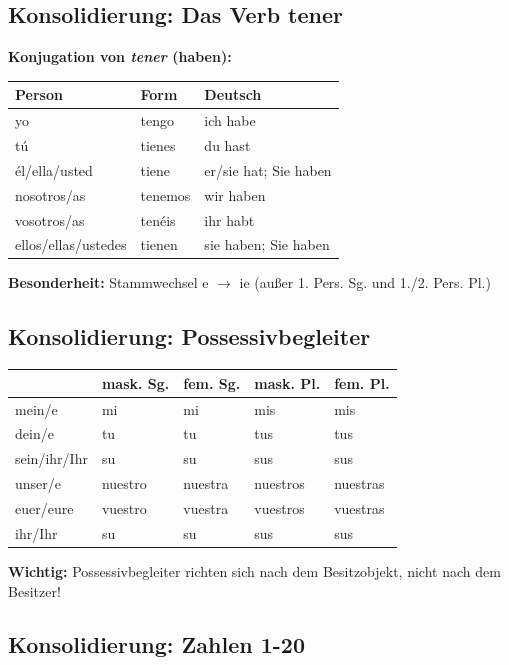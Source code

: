 \documentclass[11pt,a4paper]{article}
\begin{document}
\subsection{Konsolidierung: Das Verb tener}

\textbf{Konjugation von \textit{tener} (haben):}
\begin{center}
\begin{tabular}{|l|l|l|}
\hline
\textbf{Person} & \textbf{Form} & \textbf{Deutsch} \\
\hline
yo & tengo & ich habe \\
tú & tienes & du hast \\
él/ella/usted & tiene & er/sie hat; Sie haben \\
nosotros/as & tenemos & wir haben \\
vosotros/as & tenéis & ihr habt \\
ellos/ellas/ustedes & tienen & sie haben; Sie haben \\
\hline
\end{tabular}
\end{center}

\textbf{Besonderheit:} Stammwechsel e $\rightarrow$ ie (außer 1. Pers. Sg. und 1./2. Pers. Pl.)

\subsection{Konsolidierung: Possessivbegleiter}

\begin{center}
\begin{tabular}{|l|l|l|l|l|}
\hline
& \textbf{mask. Sg.} & \textbf{fem. Sg.} & \textbf{mask. Pl.} & \textbf{fem. Pl.} \\
\hline
mein/e & mi & mi & mis & mis \\
dein/e & tu & tu & tus & tus \\
sein/ihr/Ihr & su & su & sus & sus \\
unser/e & nuestro & nuestra & nuestros & nuestras \\
euer/eure & vuestro & vuestra & vuestros & vuestras \\
ihr/Ihr & su & su & sus & sus \\
\hline
\end{tabular}
\end{center}

\textbf{Wichtig:} Possessivbegleiter richten sich nach dem Besitzobjekt, nicht nach dem Besitzer!

\subsection{Konsolidierung: Zahlen 1-20}
\end{document}
